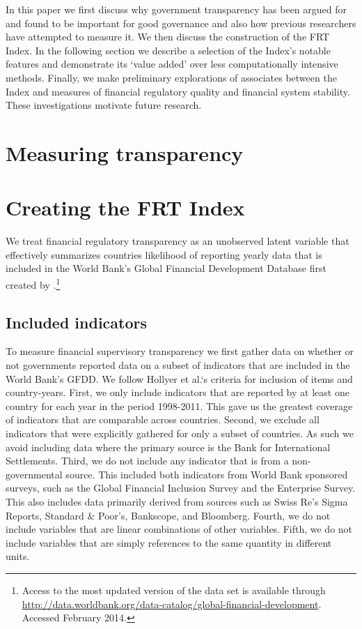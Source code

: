 \documentclass[a4paper]{article}
\begin{document}
In this paper we first discuss why government transparency has been argued for and found to be important for good governance and also how previous researchers have attempted to measure it. We then discuss the construction of the FRT Index. In the following section we describe a selection of the Index's notable features and demonstrate its `value added' over less computationally intensive methods. Finally, we make preliminary explorations of associates between the Index and measures of financial regulatory quality and financial system stability. These investigations motivate future research.  

\section{Measuring transparency}


\section{Creating the FRT Index}

We treat financial regulatory transparency as an unobserved latent variable that effectively summarizes countries likelihood of reporting yearly data that is included in the World Bank's Global Financial Development Database first created by \cite{Cihak2012}.\footnote{Access to the most updated version of the data set is available through \url{http://data.worldbank.org/data-catalog/global-financial-development}. Accessed February 2014.}

\subsection{Included indicators}

To measure financial supervisory transparency we first gather data on whether or not governments reported data on a subset of indicators that are included in the World Bank's GFDD. We follow Hollyer et al.`s \citeyearpar{Hollyer2014} criteria for inclusion of items and country-years. First, we only include indicators that are reported by at least one country for each year in the period 1998-2011. This gave us the greatest coverage of indicators that are comparable across countries. Second, we exclude all indicators that were explicitly gathered for only a subset of countries. As such we avoid including data where the primary source is the Bank for International Settlements. Third, we do not include any indicator that is from a non-governmental source. This included both indicators from World Bank sponsored surveys, such as the Global Financial Inclusion Survey and the Enterprise Survey. This also includes data primarily derived from sources such as Swiss Re's Sigma Reports, Standard \& Poor's, Bankscope, and Bloomberg. Fourth, we do not include variables that are linear combinations of other variables. Fifth, we do not include variables that are simply references to the same quantity in different units. 
\end{document}

